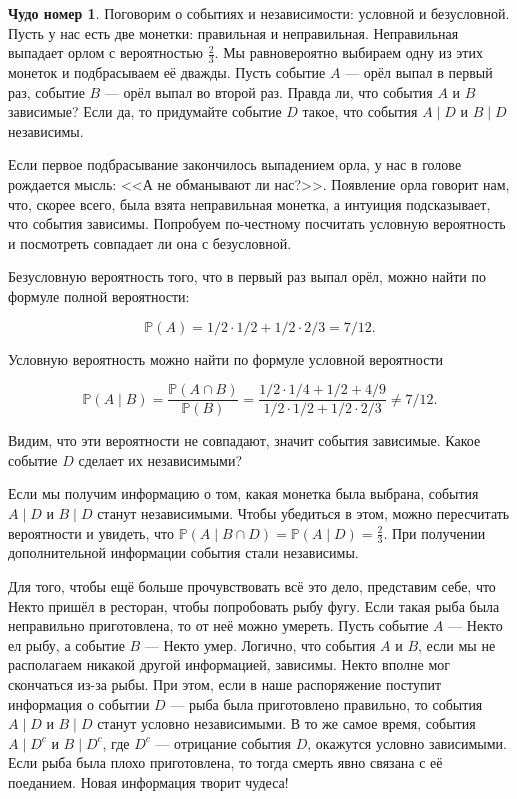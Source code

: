 \documentclass[12pt, a4paper, oneside]{extreport}
\def \mbb{\mathbb}
\def \PP{\mbb{P}}
\theoremstyle{plain}              %
\theoremstyle{definition}         %
\newtheorem{chudo}{Чудо номер}   %
\begin{document}
\begin{chudo}
Поговорим о событиях и независимости: условной и безусловной. Пусть у нас есть две монетки: правильная и неправильная. Неправильная выпадает орлом с вероятностью $\frac{2}{3}$. Мы равновероятно выбираем одну из этих монеток и подбрасываем её дважды. Пусть событие $A$ --- орёл выпал в первый раз, событие $B$ --- орёл выпал во второй раз. Правда ли, что события $A$ и $B$ зависимые? Если да, то придумайте событие $D$ такое, что события $A \mid D$ и $B \mid D$ независимы.
\end{chudo}

Если первое подбрасывание закончилось выпадением орла, у нас в голове рождается мысль: <<А не обманывают ли нас?>>. Появление орла говорит нам, что, скорее всего, была взята неправильная монетка, а интуиция подсказывает, что события зависимы. Попробуем по-честному посчитать условную вероятность и посмотреть совпадает ли она с безусловной.

 Безусловную вероятность того, что в первый раз выпал орёл, можно найти по формуле полной вероятности:

\[\PP(A) = 1/2 \cdot 1/2 + 1/2 \cdot 2/3 = 7/12. \]

Условную вероятность можно найти по формуле условной вероятности

\[\PP(A \mid B) = \frac{\PP(A \cap B)}{\PP(B)} = \frac{1/2 \cdot 1/4 + 1/2 + 4/9}{1/2 \cdot 1/2 + 1/2 \cdot 2/3} \neq 7/12.\]

Видим, что эти вероятности не совпадают, значит события зависимые. Какое событие $D$ сделает их независимыми?

 Если мы получим информацию о том, какая монетка была выбрана, события $A \mid D$ и $B \mid D$ станут независимыми. Чтобы убедиться в этом, можно пересчитать  вероятности и увидеть, что $\PP(A \mid B \cap D) = \PP(A \mid D) = \frac{2}{3}$. При получении дополнительной информации события стали независимы.

Для того, чтобы ещё больше прочувствовать всё это дело, представим себе, что Некто пришёл в ресторан, чтобы попробовать рыбу фугу. Если такая рыба была неправильно приготовлена, то от неё можно умереть. Пусть событие $A$ ---  Некто ел рыбу, а событие $B$ --- Некто умер. Логично, что события $A$ и $B$, если мы не располагаем никакой другой информацией, зависимы. Некто вполне мог скончаться из-за рыбы. При этом, если в наше распоряжение поступит информация о событии $D$ --- рыба была приготовлено правильно, то события $A \mid D$ и $B \mid D$ станут условно независимыми. В то же самое время, события $A \mid  D^c$ и $B \mid D^c$, где $D^c$ --- отрицание события $D$, окажутся условно зависимыми. Если рыба была плохо приготовлена, то тогда смерть явно связана с её поеданием. Новая информация творит чудеса!
\end{document}
